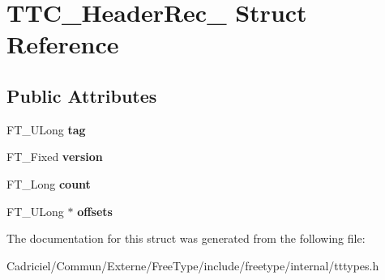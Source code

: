 \hypertarget{struct_t_t_c___header_rec__}{}\section{T\+T\+C\+\_\+\+Header\+Rec\+\_\+ Struct Reference}
\label{struct_t_t_c___header_rec__}
\subsection*{Public Attributes}
\begin{DoxyCompactItemize}
\item 
F\+T\+\_\+\+U\+Long {\bfseries tag}\hypertarget{struct_t_t_c___header_rec___a7fc09906e402f8937b6ca207c84453b4}{}\label{struct_t_t_c___header_rec___a7fc09906e402f8937b6ca207c84453b4}

\item 
F\+T\+\_\+\+Fixed {\bfseries version}\hypertarget{struct_t_t_c___header_rec___aa9ecb33279c68c3c00c1232441da5801}{}\label{struct_t_t_c___header_rec___aa9ecb33279c68c3c00c1232441da5801}

\item 
F\+T\+\_\+\+Long {\bfseries count}\hypertarget{struct_t_t_c___header_rec___a0bf5898e9d8c55bc74f51712a5ad1b58}{}\label{struct_t_t_c___header_rec___a0bf5898e9d8c55bc74f51712a5ad1b58}

\item 
F\+T\+\_\+\+U\+Long $\ast$ {\bfseries offsets}\hypertarget{struct_t_t_c___header_rec___a2ab33f787e8085d7086968fb931060b5}{}\label{struct_t_t_c___header_rec___a2ab33f787e8085d7086968fb931060b5}

\end{DoxyCompactItemize}


The documentation for this struct was generated from the following file\+:\begin{DoxyCompactItemize}
\item 
Cadriciel/\+Commun/\+Externe/\+Free\+Type/include/freetype/internal/tttypes.\+h\end{DoxyCompactItemize}
